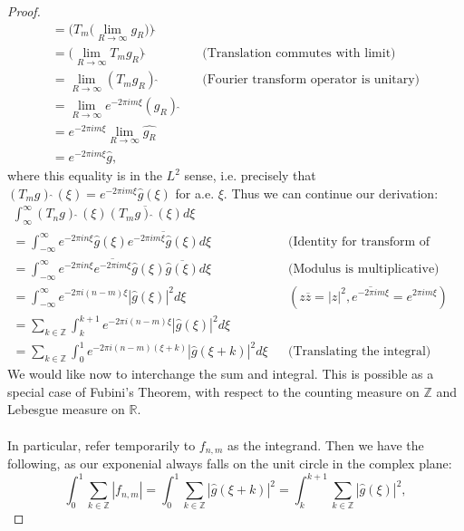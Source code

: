 \documentclass[12pt]{article}
\newenvironment{ex}[2][Exercise]{\begin{trivlist}
\item[\hskip \labelsep {\bfseries #1}\hskip \labelsep {\bfseries #2.}]}{\end{trivlist}}
\begin{document}
\begin{ex}{12}
\begin{proof}
\begin{align*}
            = \Big (T_m \Big (\underset{R \rightarrow \infty}{\lim} g_R \Big)\Big)\hat{\;} \\
            = \Big ( \underset{R \rightarrow \infty}{\lim} T_mg_R \Big)\hat{\;} && \text{(Translation commutes with limit)} \\ 
            = \underset{R \rightarrow \infty}{\lim} (T_mg_R)\hat{\;} && \text{(Fourier transform operator is unitary)} \\
            = \underset{R \rightarrow \infty}{\lim} e^{-2\pi i m\xi}(g_R)\hat{\;} \\
            = e^{-2\pi i m\xi} \underset{R \rightarrow \infty}{\lim} \hat{g_R} \\
            = e^{-2\pi i m\xi}\hat{g},
        \end{align*}
        where this equality is in the $L^2$ sense, i.e. precisely that $(T_mg)\hat{\;}(\xi) = e^{-2\pi i m \xi}\hat{g}(\xi)$ for a.e. $\xi$. Thus we can continue our derivation:
        \begin{align*}
            \int_{\infty}^\infty (T_ng)\hat{\;}(\xi)\overline{(T_mg)\hat{\;}(\xi)} d\xi \\
            = \int_{-\infty}^\infty e^{-2\pi in\xi}\hat{g}(\xi)\overline{e^{-2\pi im\xi}\hat{g}(\xi)} d\xi && \text{(Identity for transform of translation)} \\
            = \int_{-\infty}^\infty e^{-2\pi in\xi}\overline{e^{-2\pi im\xi}}\hat{g}(\xi)\overline{\hat{g}(\xi)} d\xi && \text{(Modulus is multiplicative)} \\
            = \int_{-\infty}^\infty e^{-2\pi i(n - m)\xi}|\hat{g}(\xi)|^2 d\xi && (z\overline{z} = |z|^2, \overline{e^{-2\pi im\xi}} = e^{2\pi im\xi}) \\
            = \sum_{k \in \mathbb{Z}} \int_{k}^{k + 1} e^{-2\pi i(n - m)\xi}|\hat{g}(\xi)|^2 d\xi \\
            = \sum_{k \in \mathbb{Z}} \int_0^1 e^{{-2\pi i}(n - m)(\xi + k)}|\hat{g}(\xi + k)|^2 d\xi && \text{(Translating the integral)}
        \end{align*} 
        We would like now to interchange the sum and integral. This is possible as a special case of Fubini's Theorem, with respect to the counting measure on $\mathbb{Z}$ and Lebesgue measure on $\mathbb{R}$. \\ \\
        In particular, refer temporarily to $f_{n,m}$ as the integrand. Then we have the following, as our exponenial always falls on the unit circle in the complex plane:
        $$\int_0^1 \sum_{k \in \mathbb{Z}} |f_{n,m}| = \int_0^1 \sum_{k \in \mathbb{Z}} |\hat{g}(\xi + k)|^2 = \int_{k}^{k + 1} \sum_{k \in \mathbb{Z}} |\hat{g}(\xi)|^2,$$

\end{proof}
\end{ex}
\end{document}
